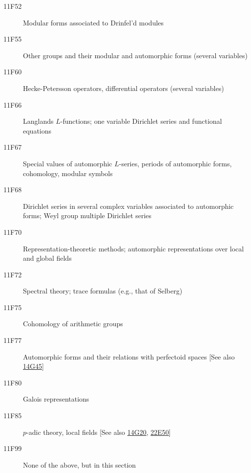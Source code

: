 \documentclass[letterpaper]{article}
\begin{document}
\begin{description}
\item [11F52]\label{11F52} Modular forms associated to Drinfel'd modules
\item [11F55]\label{11F55} Other groups and their modular and automorphic forms (several variables)
\item [11F60]\label{11F60} Hecke-Petersson operators, differential operators (several variables)
\item [11F66]\label{11F66} Langlands $L$-functions; one variable Dirichlet series and functional equations
\item [11F67]\label{11F67} Special values of automorphic $L$-series, periods of automorphic forms, cohomology, modular symbols
\item [11F68]\label{11F68} Dirichlet series in several complex variables associated to automorphic forms; Weyl group multiple Dirichlet series
\item [11F70]\label{11F70} Representation-theoretic methods; automorphic representations over local and global fields
\item [11F72]\label{11F72} Spectral theory; trace formulas (e.g., that of Selberg)
\item [11F75]\label{11F75} Cohomology of arithmetic groups
\item [11F77]\label{11F77} Automorphic forms and their relations with perfectoid spaces [See also \hyperref[14G45]{14G45}]
\item [11F80]\label{11F80} Galois representations
\item [11F85]\label{11F85} $p$-adic theory, local fields [See also \hyperref[14G20]{14G20}, \hyperref[22E50]{22E50}]
\item [11F99]\label{11F99} None of the above, but in this section
\end{description}
\end{document}
